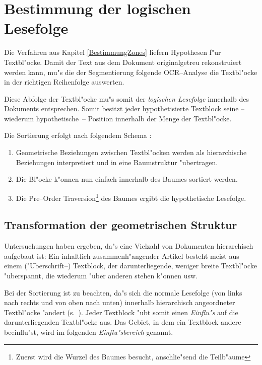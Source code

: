 \chapter{Bestimmung der logischen Lesefolge}\label{Lesefolge}

Die Verfahren aus Kapitel \ref{BestimmungZones} liefern Hypothesen f"ur Textbl"ocke.
Damit der Text aus dem Dokument originalgetreu rekonstruiert werden kann, mu"s die der Segmentierung
folgende OCR--Analyse die Textbl"ocke in der richtigen Reihenfolge auswerten.

Diese Abfolge der Textbl"ocke mu"s somit der {\em logischen Lesefolge\/} innerhalb des
Dokuments entsprechen.
Somit besitzt jeder hypothetisierte Textblock seine -- wiederum hypothetische~-- Position
innerhalb der Menge der Textbl"ocke.

Die Sortierung erfolgt nach folgendem Schema \cite{Saitoh93}:
\begin{enumerate}
  \item Geometrische Beziehungen zwischen Textbl"ocken werden als hierarchische Beziehungen
  interpretiert und in eine Baumstruktur "ubertragen.
  \item Die Bl"ocke k"onnen nun einfach innerhalb des Baumes sortiert werden.
  \item Die Pre--Order Traversion\footnote{Zuerst wird die Wurzel des Baumes besucht, 
  anschlie"send die Teilb"aume} des Baumes ergibt die hypothetische Lesefolge.
\end{enumerate}

\section{Transformation der geometrischen Struktur}

Untersuchungen haben ergeben, da"s eine Vielzahl von Dokumenten hierarchisch aufgebaut ist:
Ein inhaltlich zusammenh"angender Artikel besteht meist aus einem \mbox{("Uberschrift--)} Textblock, der
darunterliegende, weniger breite Textbl"ocke "uberspannt, 
die wiederum "uber anderen stehen k"onnen usw.

Bei der Sortierung ist zu beachten, da"s sich die normale Lesefolge (von links nach rechts und
von oben nach unten) innerhalb hierarchisch angeordneter Textbl"ocke "andert 
(s.\ ). Jeder Textblock "ubt somit einen {\em Einflu"s\/} auf die darunterliegenden
Textbl"ocke aus. Das Gebiet, in dem ein Textblock andere beeinflu"st, wird im folgenden
{\em Einflu"sbereich\/} genannt.

